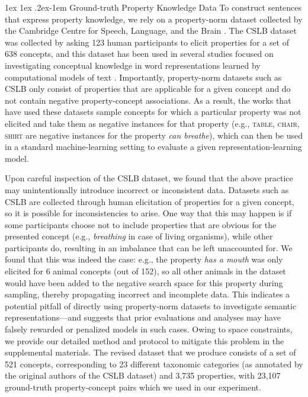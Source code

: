 \documentclass[10pt,letterpaper]{article}
\makeatletter
\renewcommand{\paragraph}{%
  \@startsection{paragraph}{4}%
  {\z@}{1ex \@plus 1ex \@minus .2ex}{-1em}%
  {\normalfont\normalsize\bfseries}%
}
\makeatother
\begin{document}
\paragraph{Ground-truth Property Knowledge Data}
To construct sentences that express property knowledge, we rely on a property-norm dataset collected by the Cambridge Centre for Speech, Language, and the Brain \citep[CSLB;][]{devereux2014centre}.
The CSLB dataset was collected by asking 123 human participants to elicit properties for a set of 638 concepts, and this dataset has been used in several studies focused on investigating conceptual knowledge in word representations learned by computational models of text \citep[e.g., ][]{lucy-gauthier-2017-distributional, da-kasai-2019-cracking, bhatia2020transformer}.
Importantly, property-norm datasets such as CSLB only consist of properties that are applicable for a given concept and do not contain negative property-concept associations.
As a result, the works that have used these datasets
sample concepts for which a particular property was not elicited and take them as negative instances for that property (e.g., \textsc{table, chair, shirt} are negative instances for the property \textit{can breathe}), which can then be used in a standard machine-learning setting to evaluate a given representation-learning model.

Upon careful inspection of the CSLB dataset, we found that the above practice may unintentionally introduce incorrect or inconsistent data.
Datasets such as CSLB are collected through human elicitation of properties for a given concept, so it is possible for inconsistencies to arise. One way that this may happen is if some participants choose not to include properties that are obvious for the presented concept (e.g., \textit{breathing} in case of living organisms), while other participants do, resulting in an imbalance that can be left unaccounted for.
We found that this was indeed the case: e.g., the property \textit{has a mouth} was only elicited for 6 animal concepts (out of 152), so all other animals in the dataset would have been added to the negative search space for this property during sampling, thereby propagating incorrect and incomplete data. This indicates a potential pitfall of directly using property-norm datasets to investigate semantic representations---and suggests that prior evaluations and analyses \citep{lucy-gauthier-2017-distributional, da-kasai-2019-cracking, bhatia2020transformer} may have falsely rewarded or penalized models in such cases. 
Owing to space constraints, we provide our detailed method and protocol to mitigate this problem in the supplemental materials. The revised dataset that we produce consists of a set of 521 concepts, corresponding to 23 different taxonomic categories (as annotated by the original authors of the CSLB dataset) and 3{,}735 properties, with 23{,}107 ground-truth property-concept pairs which we used in our experiment.
\end{document}
